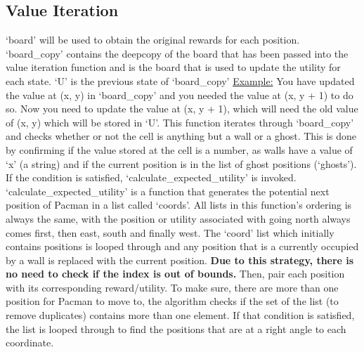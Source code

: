 \documentclass[a4paper]{report}
\begin{document}
      \subsection*{Value Iteration}
        `board' will be used to obtain the original rewards for each position.
        \newline `board\_copy' contains the deepcopy of the board that has been passed into the value iteration function and is the board that is used to update the utility for each state.
        \newline `U' is the previous state of `board\_copy'
        \newline
        \newline \hspace*{1cm} \underline{Example:}
        \newline \hspace*{1cm} You have updated the value at (x, y) in `board\_copy' and you needed the value at (x, y + 1) to do so. Now \hspace*{1cm} you need to update the value at (x, y + 1), which will need the old value of (x, y) which will be stored in `U'.
        \newline \newline
        This function iterates through `board\_copy' and checks whether or not the cell is anything but a wall or a ghost. This is done by confirming if the value stored at the cell is a number, as walls have a value of `x' (a string) and if the current position is in the list of ghost positions (`ghosts'). If the condition is satisfied, `calculate\_expected\_utility' is invoked.
        \newline \newline
        `calculate\_expected\_utility' is a function that generates the potential next position of Pacman in a list called `coords'. All lists in this function's ordering is always the same, with the position or utility associated with going north always comes first, then east, south and finally west. The `coord' list which initially contains positions is looped through and any position that is a currently occupied by a wall is replaced with the current position. \textbf{Due to this strategy, there is no need to check if the index is out of bounds.} Then, pair each position with its corresponding reward/utility. To make sure, there are more than one position for Pacman to move to, the algorithm checks if the set of the list (to remove duplicates) contains more than one element. If that condition is satisfied, the list is looped through to find the positions that are at a right angle to each coordinate.
\end{document}
